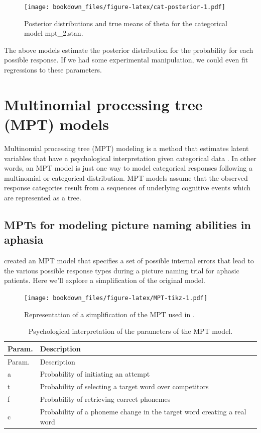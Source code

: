 \documentclass[12pt,]{krantz}
\theoremstyle{definition}
\theoremstyle{definition}
\theoremstyle{definition}
\theoremstyle{remark}
\begin{document}
\begin{figure}
\centering
\texttt{[image: bookdown\_files/figure-latex/cat-posterior-1.pdf]}
\caption{\label{fig:cat-posterior}Posterior distributions and true means of
theta for the categorical model mpt\_2.stan.}
\end{figure}

The above models estimate the posterior distribution for the probability
for each possible response. If we had some experimental manipulation, we
could even fit regressions to these parameters.

\section{Multinomial processing tree (MPT)
models}\label{multinomial-processing-tree-mpt-models}

Multinomial processing tree (MPT) modeling is a method that estimates
latent variables that have a psychological interpretation given
categorical data \citep[a review is provided
in][]{BatchelderRiefer1999}. In other words, an MPT model is just one
way to model categorical responses following a multinomial or
categorical distribution. MPT models assume that the observed response
categories result from a sequences of underlying cognitive events which
are represented as a tree.

\subsection{MPTs for modeling picture naming abilities in
aphasia}\label{mpts-for-modeling-picture-naming-abilities-in-aphasia}

\citet{WalkerEtAl2018} created an MPT model that specifies a set of
possible internal errors that lead to the various possible response
types during a picture naming trial for aphasic patients. Here we'll
explore a simplification of the original model.




\begin{figure}
\centering
\texttt{[image: bookdown\_files/figure-latex/MPT-tikz-1.pdf]}
\caption{\label{fig:MPT-tikz}Representation of a simplification of the MPT used in
\citet{WalkerEtAl2018}.}
\end{figure}

\begin{longtable}[]{@{}ll@{}}
\caption{\label{tab:MPT-params} Psychological interpretation of the
parameters of the MPT model.}\tabularnewline
\toprule
Param. & Description\tabularnewline
\midrule
\endfirsthead
\toprule
Param. & Description\tabularnewline
\midrule
\endhead
a & Probability of initiating an attempt\tabularnewline
t & Probability of selecting a target word over
competitors\tabularnewline
f & Probability of retrieving correct phonemes\tabularnewline
c & Probability of a phoneme change in the target word creating a real
word\tabularnewline
\bottomrule
\end{longtable}
\end{document}
